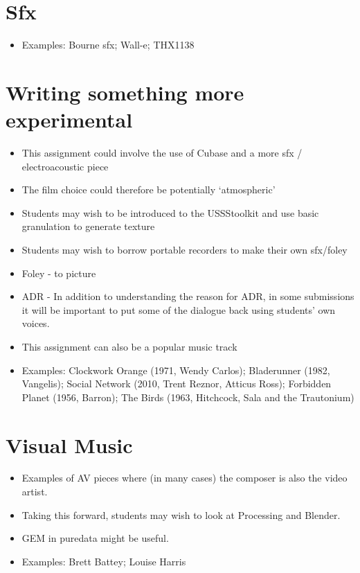 \section{Sfx}
\begin{itemize}
\item Examples: Bourne sfx; Wall-e; THX1138

\end{itemize}

\section{Writing something more experimental}
\begin{itemize}
\item This assignment could involve the use of Cubase and a more sfx / electroacoustic piece
\item The film choice could therefore be potentially `atmospheric'
\item Students may wish to be introduced to the USSStoolkit and use basic granulation to generate texture
\item Students may wish to borrow portable recorders to make their own sfx/foley
\item Foley - to picture
\item ADR - In addition to understanding the reason for ADR, in some submissions it will be important to put some of the dialogue back using students' own voices. 
\item This assignment can also be a popular music track  
\item Examples: Clockwork Orange (1971, Wendy Carlos); Bladerunner (1982, Vangelis); Social Network (2010, Trent Reznor, Atticus Ross); Forbidden Planet (1956, Barron); The Birds (1963, Hitchcock, Sala and the Trautonium)
\end{itemize}

\section{Visual Music}
\begin{itemize}
\item Examples of AV pieces where (in many cases) the composer is also the video artist. 
\item Taking this forward, students may wish to look at Processing and Blender. 
\item GEM in puredata might be useful.
\item Examples: Brett Battey; Louise Harris
\end{itemize}

